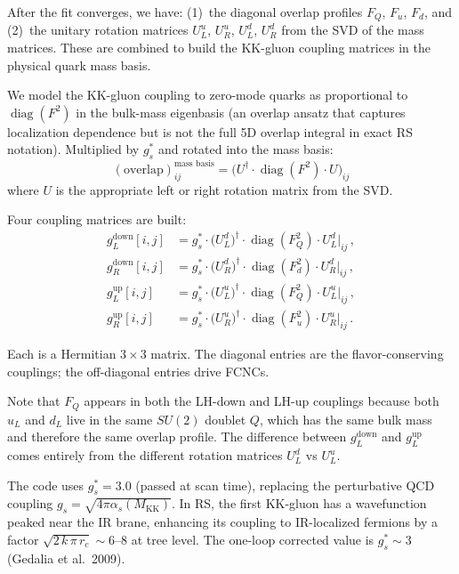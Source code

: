 \documentclass[11pt]{article}
\newcommand{\Mkk}{M_{\mathrm{KK}}}
\newcommand{\gs}{g_s^*}
\begin{document}
After the fit converges, we have: (1)~the diagonal overlap profiles $F_Q$,
$F_u$, $F_d$, and (2)~the unitary rotation matrices $U_L^u$, $U_R^u$,
$U_L^d$, $U_R^d$ from the SVD of the mass matrices.  These are combined to
build the KK-gluon coupling matrices in the physical quark mass basis.

We model the KK-gluon coupling to zero-mode quarks as proportional to
$\operatorname{diag}(F^2)$ in the bulk-mass eigenbasis (an overlap ansatz that
captures localization dependence but is not the full 5D overlap integral in
exact RS notation).  Multiplied by $\gs$ and rotated into the mass basis:
\begin{equation}
  (\text{overlap})_{ij}^{\text{mass basis}} = \bigl(U^\dagger \cdot
    \operatorname{diag}(F^2) \cdot U\bigr)_{ij}
\end{equation}
where $U$ is the appropriate left or right rotation matrix from the SVD.

Four coupling matrices are built:
\begin{align}
  g_L^{\mathrm{down}}[i,j] &= \gs \cdot \bigl(U_L^d\bigr)^\dagger
    \cdot \operatorname{diag}(F_Q^2) \cdot U_L^d \Big|_{ij}\,, \\
  g_R^{\mathrm{down}}[i,j] &= \gs \cdot \bigl(U_R^d\bigr)^\dagger
    \cdot \operatorname{diag}(F_d^2) \cdot U_R^d \Big|_{ij}\,, \\
  g_L^{\mathrm{up}}[i,j] &= \gs \cdot \bigl(U_L^u\bigr)^\dagger
    \cdot \operatorname{diag}(F_Q^2) \cdot U_L^u \Big|_{ij}\,, \\
  g_R^{\mathrm{up}}[i,j] &= \gs \cdot \bigl(U_R^u\bigr)^\dagger
    \cdot \operatorname{diag}(F_u^2) \cdot U_R^u \Big|_{ij}\,.
\end{align}

Each is a Hermitian $3\times3$ matrix.  The diagonal entries are the
flavor-conserving couplings; the off-diagonal entries drive FCNCs.

Note that $F_Q$ appears in both the LH-down and LH-up couplings because both
$u_L$ and $d_L$ live in the same $SU(2)$ doublet $Q$, which has the same bulk
mass and therefore the same overlap profile.  The difference between
$g_L^{\mathrm{down}}$ and $g_L^{\mathrm{up}}$ comes entirely from the
different rotation matrices $U_L^d$ vs $U_L^u$.

The code uses $\gs = 3.0$ (passed at scan time),
replacing the perturbative QCD coupling
$g_s = \sqrt{4\pi\alpha_s(\Mkk)}$.  In RS, the first KK-gluon has a
wavefunction peaked near the IR brane, enhancing its coupling to IR-localized
fermions by a factor $\sqrt{2\,k\,\pi\,r_c} \sim 6$--$8$ at tree level.  The
one-loop corrected value is $\gs \sim 3$ (Gedalia et al.\ 2009).
\end{document}
